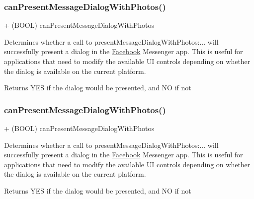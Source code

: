 \subsubsection{\texorpdfstring{can\+Present\+Message\+Dialog\+With\+Photos()}{canPresentMessageDialogWithPhotos()}\hspace{0.1cm}{\footnotesize\ttfamily [2/5]}}
{\footnotesize\ttfamily + (B\+O\+OL) can\+Present\+Message\+Dialog\+With\+Photos \begin{DoxyParamCaption}{ }\end{DoxyParamCaption}}

Determines whether a call to {\ttfamily present\+Message\+Dialog\+With\+Photos\+:...} will successfully present a dialog in the \hyperlink{interfaceFacebook}{Facebook} Messenger app. This is useful for applications that need to modify the available UI controls depending on whether the dialog is available on the current platform.

\begin{DoxyReturn}{Returns}
Y\+ES if the dialog would be presented, and NO if not 
\end{DoxyReturn}
\mbox{\label{interfaceFBDialogs_ac10e310c30d763c7885c11fb44ac4924}} 
\subsubsection{\texorpdfstring{can\+Present\+Message\+Dialog\+With\+Photos()}{canPresentMessageDialogWithPhotos()}\hspace{0.1cm}{\footnotesize\ttfamily [3/5]}}
{\footnotesize\ttfamily + (B\+O\+OL) can\+Present\+Message\+Dialog\+With\+Photos \begin{DoxyParamCaption}{ }\end{DoxyParamCaption}}

Determines whether a call to {\ttfamily present\+Message\+Dialog\+With\+Photos\+:...} will successfully present a dialog in the \hyperlink{interfaceFacebook}{Facebook} Messenger app. This is useful for applications that need to modify the available UI controls depending on whether the dialog is available on the current platform.

\begin{DoxyReturn}{Returns}
Y\+ES if the dialog would be presented, and NO if not 
\end{DoxyReturn}
\mbox{\label{interfaceFBDialogs_ac10e310c30d763c7885c11fb44ac4924}} 
